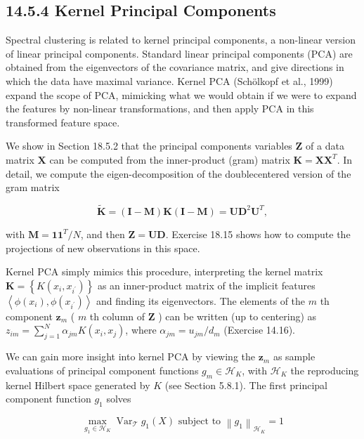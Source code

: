 \documentclass[10pt]{article}
\begin{document}
\subsection*{14.5.4 Kernel Principal Components}
Spectral clustering is related to kernel principal components, a non-linear version of linear principal components. Standard linear principal components (PCA) are obtained from the eigenvectors of the covariance matrix, and give directions in which the data have maximal variance. Kernel PCA (Schölkopf et al., 1999) expand the scope of PCA, mimicking what we would obtain if we were to expand the features by non-linear transformations, and then apply PCA in this transformed feature space.

We show in Section 18.5.2 that the principal components variables $\mathbf{Z}$ of a data matrix $\mathbf{X}$ can be computed from the inner-product (gram) matrix $\mathbf{K}=\mathbf{X} \mathbf{X}^{T}$. In detail, we compute the eigen-decomposition of the doublecentered version of the gram matrix


\begin{equation*}
\widetilde{\mathbf{K}}=(\mathbf{I}-\mathbf{M}) \mathbf{K}(\mathbf{I}-\mathbf{M})=\mathbf{U D}^{2} \mathbf{U}^{T}, \tag{14.65}
\end{equation*}


with $\mathbf{M}=\mathbf{1 1}^{T} / N$, and then $\mathbf{Z}=\mathbf{U D}$. Exercise 18.15 shows how to compute the projections of new observations in this space.

Kernel PCA simply mimics this procedure, interpreting the kernel matrix $\mathbf{K}=\left\{K\left(x_{i}, x_{i^{\prime}}\right)\right\}$ as an inner-product matrix of the implicit features $\left\langle\phi\left(x_{i}\right), \phi\left(x_{i^{\prime}}\right)\right\rangle$ and finding its eigenvectors. The elements of the $m$ th component $\mathbf{z}_{m}$ ( $m$ th column of $\mathbf{Z}$ ) can be written (up to centering) as $z_{i m}=\sum_{j=1}^{N} \alpha_{j m} K\left(x_{i}, x_{j}\right)$, where $\alpha_{j m}=u_{j m} / d_{m}$ (Exercise 14.16).

We can gain more insight into kernel PCA by viewing the $\mathbf{z}_{m}$ as sample evaluations of principal component functions $g_{m} \in \mathcal{H}_{K}$, with $\mathcal{H}_{K}$ the reproducing kernel Hilbert space generated by $K$ (see Section 5.8.1). The first principal component function $g_{1}$ solves


\begin{equation*}
\max _{g_{1} \in \mathcal{H}_{K}} \operatorname{Var}_{\mathcal{T}} g_{1}(X) \text { subject to }\left\|g_{1}\right\|_{\mathcal{H}_{K}}=1 \tag{14.66}
\end{equation*}
\end{document}
